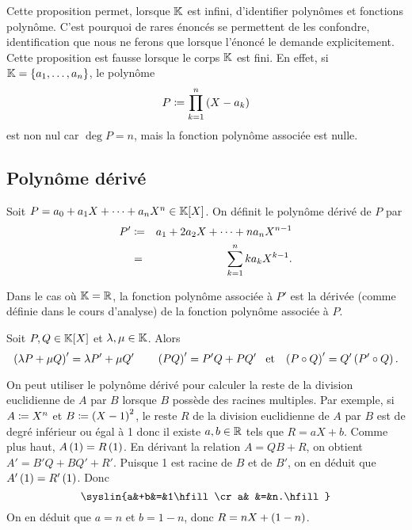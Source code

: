 \documentclass{magnolia}
\begin{document}
\begin{remarques}
\remarque Cette proposition permet, lorsque $\mathbb{K}$ est infini, d'identifier polynômes et
  fonctions polynôme. C'est pourquoi de rares énoncés se
  permettent de les confondre, identification
  que nous ne ferons que lorsque l'énoncé le demande explicitement.
\remarque Cette proposition est fausse lorsque le corps $\mathbb{K}$ est fini. En effet,
  si $\mathbb{K}=\left\{a_1,\ldots,a_n\right\}$, le polynôme
  \[P\coloneqq\prod_{k=1}^n \left(X-a_k\right)\]
  est non nul car $\deg P=n$, mais la fonction polynôme associée est nulle.
\end{remarques}

\subsection{Polynôme dérivé}

\begin{definition}
Soit $P=a_0+a_1 X+\cdots+a_n X^n\in\polyK$. On définit le polynôme dérivé de
$P$ par
\begin{eqnarray*}
P' &\coloneqq& a_1 + 2a_2 X+\cdots+na_nX^{n-1}\\
   &=& \sum_{k=1}^n ka_k X^{k-1}.
\end{eqnarray*}
\end{definition}

\begin{remarqueUnique}
\remarque Dans le cas où $\mathbb{K}=\mathbb{R}$, la fonction polynôme associée à $P'$ est
  la dérivée (comme définie dans le cours d'analyse) de la fonction
  polynôme associée à $P$.
\end{remarqueUnique}

\begin{proposition}
Soit $P,Q\in\polyK$ et $\lambda,\mu\in\mathbb{K}$. Alors
\[\left(\lambda P+\mu Q\right)'=\lambda P'+\mu Q' \qquad
  \left(PQ\right)'=P'Q+PQ' \quad\!\text{et}\quad\! \left(P\circ Q\right)'=Q'\left(P'\circ Q\right).\]
\end{proposition}

\begin{remarqueUnique}
\remarque On peut utiliser le polynôme dérivé pour calculer la reste de la division
  euclidienne de $A$ par $B$ lorsque $B$ possède des racines multiples.
  Par exemple, si $A\coloneqq X^n$
  et $B\coloneqq \left(X-1\right)^2$, le reste $R$ de la division euclidienne de $A$ par $B$
  est de degré inférieur ou égal à 1 donc il existe $a,b\in\mathbb{R}$ tels que
  $R=aX+b$. Comme plus haut, $A\left(1\right)=R\left(1\right)$. En dérivant la relation
  $A=QB+R$, on obtient $A'=B'Q+BQ'+R'$. Puisque 1 est racine de $B$ et de $B'$, on
  en déduit que $A'\left(1\right)=R'\left(1\right)$. Donc
  \[\syslin{a&+b&=&1\hfill\cr
            a&  &=&n.\hfill}\]
  On en déduit que $a=n$ et $b=1-n$, donc $R=nX+\left(1-n\right)$.
\end{remarqueUnique}
\end{document}

